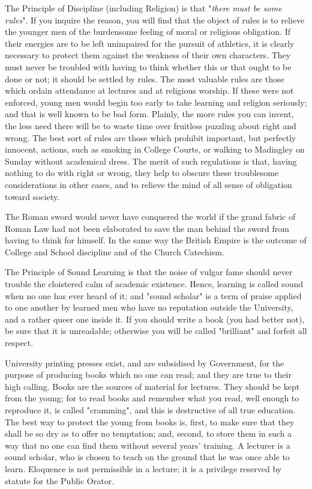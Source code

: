 \documentclass[12pt, oneside, b5paper]{memoir}
\begin{document}
The Principle of Discipline (including Religion) is that "\textit{there must be some rules}". If you inquire the reason, you will find that the object of rules is to relieve the younger men of the burdensome feeling of moral or religious obligation. If their energies are to be left unimpaired for the pursuit of athletics, it is clearly necessary to protect them against the weakness of their own characters. They must never be troubled with having to think whether this or that ought to be done or not; it should be settled by rules. The most valuable rules are those which ordain attendance at lectures and at religious worship. If these were not enforced, young men would begin too early to take learning and religion seriously; and that is well known to be bad form. Plainly, the more rules you can invent, the less need there will be to waste time over fruitless puzzling about right and wrong. The best sort of rules are those which prohibit important, but perfectly innocent, actions, such as smoking in College Courts, or walking to Madingley on Sunday without academical dress. The merit of such regulations is that, having nothing to do with right or wrong, they help to obscure these troublesome considerations in other cases, and to relieve the mind of all sense of obligation toward society.

The Roman sword would never have conquered the world if the grand fabric of Roman Law had not been elaborated to save the man behind the sword from having to think for himself. In the same way the British Empire is the outcome of College and School discipline and of the Church Catechism.

The Principle of Sound Learning is that the noise of vulgar fame should never trouble the cloistered calm of academic existence. Hence, learning is called sound when no one has ever heard of it; and "sound scholar" is a term of praise applied to one another by learned men who have no reputation outside the University, and a rather queer one inside it. If you should write a book (you had better not), be sure that it is unreadable; otherwise you will be called "brilliant" and forfeit all respect.

University printing presses exist, and are subsidised by Government, for the purpose of producing books which no one can read; and they are true to their high calling. Books are the sources of material for lectures. They should be kept from the young; for to read books and remember what you read, well enough to reproduce it, is called "cramming", and this is destructive of all true education. The best way to protect the young from books is, first, to make sure that they shall be so dry as to offer no temptation; and, second, to store them in such a way that no one can find them without several years' training. A lecturer is a sound scholar, who is chosen to teach on the ground that he was once able to learn. Eloquence is not permissible in a lecture; it is a privilege reserved by statute for the Public Orator.
\end{document}
